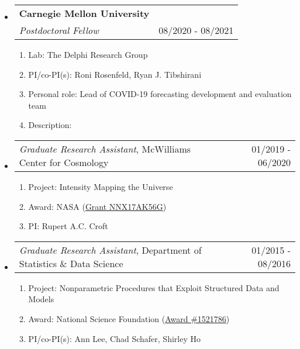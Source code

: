 \documentclass[letterpaper,10pt]{article}
\makeatletter
\newcommand{\subheading}[2]{
\begin{tabular*}{6.5in}{l@{\cftdotfill{\cftsecdotsep}\extracolsep{\fill}}r}
#1 & #2 \\ 
\end{tabular*}}
\newcommand{\subheadingtwo}[4]{
\begin{tabular*}{6.5in}{l@{\cftdotfill{\cftsecdotsep}\extracolsep{\fill}}r}
\textbf{#1} & #2 \\
#3 & {#4} \\
\end{tabular*}}
\makeatother
\begin{document}
\begin{itemize}[leftmargin=0.4cm]

\item[] \subheadingtwo{Carnegie Mellon University}{}{\emph{Postdoctoral Fellow}}{08/2020 - 08/2021}
\vspace{-0.3cm}

\begin{enumerate}[leftmargin=0.5cm]
	\setlength\itemsep{-0.05ex}
	\item[] Lab: The Delphi Research Group
	\item[] PI/co-PI(s): Roni Rosenfeld, Ryan J. Tibshirani
	\item[] Personal role: Lead of COVID-19 forecasting development and evaluation team
	\item[] Description:
\vspace{-0.1cm}
{}
\end{enumerate}

\vspace{0.05cm}

\item[] \subheading{{\it Graduate Research Assistant}, McWilliams Center for Cosmology}{01/2019 - 06/2020}
\vspace{-0.5cm}

\begin{enumerate}[leftmargin=0.5cm]
	\setlength\itemsep{-0.05ex}
	\item[] Project: Intensity Mapping the Universe
	\item[] Award: NASA (\href{http://adsabs.harvard.edu/abs/2016atp..prop...26C}{Grant NNX17AK56G})
	\item[] PI: Rupert A.C. Croft
\end{enumerate}

\vspace{0.05cm}

\item[] \subheading{{\it Graduate Research Assistant}, Department of Statistics \& Data Science}{01/2015 - 08/2016}
\vspace{-0.5cm}

\begin{enumerate}[leftmargin=0.5cm]
	\setlength\itemsep{-0.05ex}
	\item[] Project: Nonparametric Procedures that Exploit Structured Data and Models 
	\item[] Award: National Science Foundation (\href{https://www.nsf.gov/awardsearch/showAward?AWD_ID=1521786}{Award \#1521786})
	\item[] PI/co-PI(s): Ann Lee, Chad Schafer, Shirley Ho
\end{enumerate}



\end{itemize}
\end{document}
